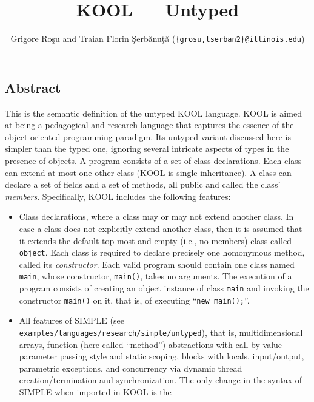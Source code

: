\setlength{\parindent}{1em}
\title{KOOL --- Untyped}
\author{Grigore Ro\c{s}u and 
        Traian Florin \c{S}erb\u{a}nu\c{t}\u{a}
        (\texttt{\{grosu,tserban2\}@illinois.edu})}

\maketitle

\begin{latexComment}
\section{Abstract}
This is the \K semantic definition of the untyped KOOL language.
KOOL is aimed at being a pedagogical and research language that
captures the essence of the object-oriented programming paradigm.
Its untyped variant discussed here is simpler than the typed one,
ignoring several intricate aspects of types in the
presence of objects.  A program consists of a set of class declarations.
Each class can extend at most one other class (KOOL is single-inheritance).
A class can declare a set of fields and a set of methods, all public and
called the class' \textit{members}.
Specifically, KOOL includes the following features:
\begin{itemize}
\item Class declarations, where a class may or may not extend another class.
In case a class does not explicitly extend another class, then it is assumed
that it extends the default top-most and empty (i.e., no members)
class called \texttt{object}.  Each class is required to declare precisely one
homonymous method, called its \textit{constructor}.  Each valid
program should contain one class named \texttt{main}, whose
constructor, \texttt{main()}, takes no arguments.  The execution of a
program consists of creating an object instance of class \texttt{main}
and invoking the constructor \texttt{main()} on it, that is, of
executing ``\texttt{new main();}''.
\item All features of SIMPLE (see
{\footnotesize\texttt{examples/languages/research/simple/untyped}}),
that is, multidimensional arrays, function (here called ``method'')
abstractions with call-by-value parameter passing style and static
scoping, blocks with locals, input/output, parametric exceptions, and
concurrency via dynamic thread creation/termination and synchronization.  
The only change in the syntax of SIMPLE when imported in KOOL is the

\end{itemize}
\end{latexComment}
